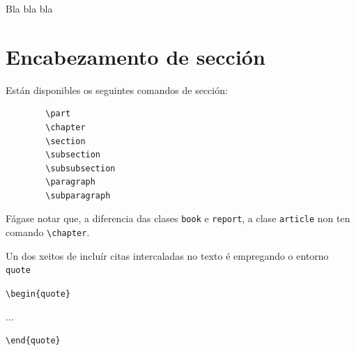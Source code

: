 \documentclass[a4paper,11pt,openright,twoside]{report}      %
\begin{document}
Bla bla bla
 
\section{Encabezamento de sección}      %
Están disponibles os seguintes comandos de sección:

 \begin{verbatim}                                         
        \part 
        \chapter                            
        \section 
        \subsection  
        \subsubsection  
        \paragraph 
        \subparagraph 
 \end{verbatim}                         %

Fágase notar que, a diferencia das clases \texttt{book} e \texttt{report}, a clase
\texttt{article} non ten comando \verb+\chapter+.

Un dos xeitos de incluír citas intercaladas no texto é empregando o entorno \verb+quote+

\begin{center}
\verb+\begin{quote}+

$\ldots$

\verb+\end{quote}+
\end{center}
\end{document}

